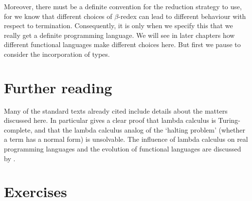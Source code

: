 Moreover, there must be a definite convention for the reduction strategy to
use, for we know that different choices of $\beta$-redex can lead to different
behaviour with respect to termination. Consequently, it is only when we specify
this that we really get a definite programming language. We will see in later
chapters how different functional languages make different choices here. But
first we pause to consider the incorporation of types.

\section{Further reading}

Many of the standard texts already cited include details about the matters
discussed here. In particular  gives a clear proof that
lambda calculus is Turing-complete, and that the lambda calculus analog of the
`halting problem' (whether a term has a normal form) is unsolvable. The
influence of lambda calculus on real programming languages and the evolution of
functional languages are discussed by .

%

\section*{Exercises}

